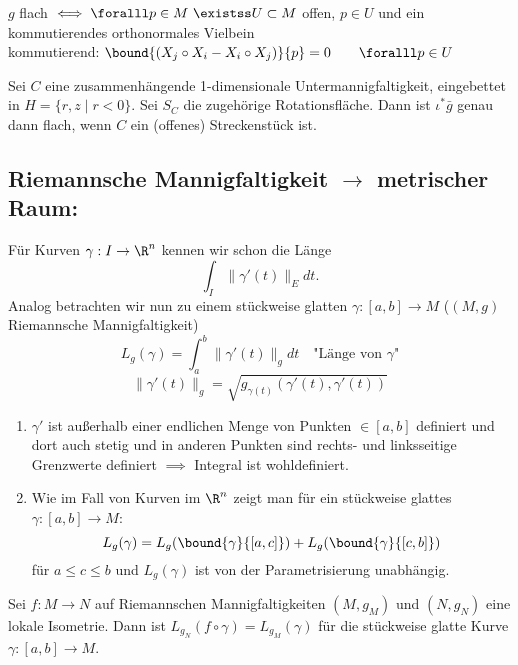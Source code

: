 \begin{rem}
	$g$ flach $ \iff \foralll p \in M \ \existss U \subset M $ offen, $p \in U$ und ein kommutierendes orthonormales Vielbein\\
	kommutierend: $ \bound{(X_j \circ X_i - X_i \circ X_j)}{p} = 0 \qquad \foralll p \in U $
\end{rem}

\begin{lem}
	Sei $C$ eine zusammenhängende 1-dimensionale Untermannigfaltigkeit, eingebettet in $ H = \{r,z \mid r<0\} $. Sei $S_C$ die zugehörige Rotationsfläche. Dann ist $ \iota^*\bar{g} $ genau dann flach, wenn $C$ ein (offenes) Streckenstück ist.
\end{lem}

\subsection*{Riemannsche Mannigfaltigkeit $\to$ metrischer Raum:}

Für Kurven $ \gamma: I \to \R^n $ kennen wir schon die Länge 
\[ \int_I \|\gamma'(t)\|_E dt. \]
Analog betrachten wir nun zu einem stückweise glatten $ \gamma: [a,b] \to M $ ($(M,g)$ Riemannsche Mannigfaltigkeit)
\[ L_g(\gamma) = \int_a^b \|\gamma'(t)\|_g dt \quad \text{"Länge von $\gamma$"} \]
\[ \|\gamma'(t)\|_g = \sqrt{g_{\gamma(t)} (\gamma'(t), \gamma'(t))} \]

\begin{rem}
	\begin{enumerate}[label={\roman*})]
		\item $\gamma'$ ist außerhalb einer endlichen Menge von Punkten $\in [a,b]$ definiert und dort auch stetig und in anderen Punkten sind rechts- und linksseitige Grenzwerte definiert $\implies$ Integral ist wohldefiniert.
		\item Wie im Fall von Kurven im $\R^n$ zeigt man für ein stückweise glattes $\gamma: [a,b] \to M$:
		\[ L_g(\gamma) = L_g (\bound{\gamma}{[a,c]}) + L_g (\bound{\gamma}{[c,b]}) \]
		für $a \leq c \leq b$ und $L_g(\gamma)$ ist von der Parametrisierung unabhängig.
	\end{enumerate}
\end{rem}

\begin{lem}\label{6.12}
	Sei $ f: M \to N $ auf Riemannschen Mannigfaltigkeiten $(M,g_M)$ und $(N,g_N)$ eine lokale Isometrie. Dann ist $ L_{g_N}(f \circ \gamma) = L_{g_M} (\gamma) $ für die stückweise glatte Kurve $\gamma: [a,b] \to M$.
\end{lem}

